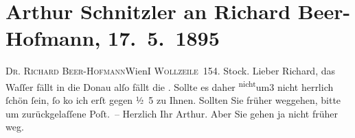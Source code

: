

         
         \renewcommand{\erwaehntePersonen}{Personen: Lou Andreas-Salomé, Richard Beer-Hofmann}
         \renewcommand{\erwaehnteOrte}{Orte: I., Innere Stadt, Wachau, Wien, Wollzeile}
         \renewcommand{\erwaehnteWerke}{}
               \section[Arthur Schnitzler an Richard Beer-Hofmann, 17. 5. 1895]{ Arthur Schnitzler an Richard Beer-Hofmann, 17. 5. 1895}\nopagebreak{}\rehead{ }\begin{ledgroupsized}[t]{13cm}\normalsize\beginnumbering \toendnotes[C]{\smallbreak\pagebreak[2]} 
\toendnotes[C]{\smallbreak}\pstart{}{\pb}\textsc{Dr. Richard Beer-Hofmann}\pend{}\pstart{}Wien\pend{}\pstart{}\textsc{I Wollzeile 15}\pend{}\pstart{}4. Stock.\pend{}{\bigskip}\pstart
           \noindent{}{\pb}Lieber Richard, das Waſſer fällt in die Donau alſo fällt die \label{K_L00442_1v}\label{K_L00442_1h}. Sollte es daher \substVorne{}\textsuperscript{nicht}\substDazwischen{}um\substHinten{}{ }3 nicht herrlich ſchön ſein, ſo ko{\geminationm} ich
               erſt gegen ½ 5 zu Ihnen. Sollten Sie früher weggehen, bitte um
               zurückgelaſſene Poſt. –\pend
           \pstart
           Herzlich Ihr \spacefill\mbox{Arthur}.\pend
           \pstart
           \noindent{}Aber Sie gehen ja nicht früher weg.\pend
           
         
         \endnumbering{}\end{ledgroupsized}  \newcommand{\dateiname}{L00442}\newcommand{\titel}{Arthur Schnitzler an Richard Beer-Hofmann, 17. 5. 1895}\newcommand{\editorInnen}{Martin Anton Müller und Gerd-Hermann Susen}
      